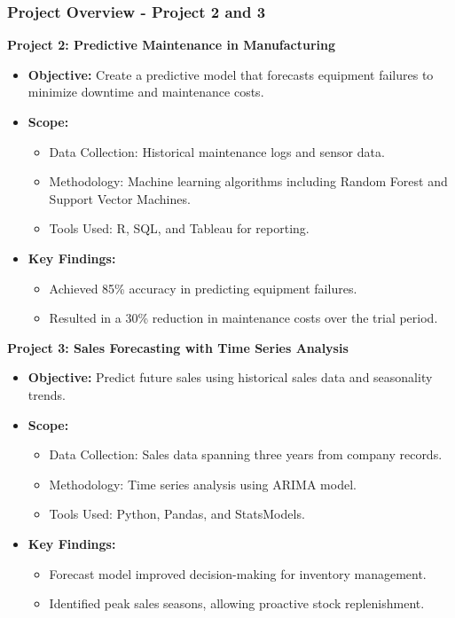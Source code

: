 \documentclass[aspectratio=169]{beamer}
\begin{document}
\begin{frame}[fragile]
    \frametitle{Project Overview - Project 2 and 3}
    \textbf{Project 2: Predictive Maintenance in Manufacturing}
    \begin{itemize}
        \item \textbf{Objective:} Create a predictive model that forecasts equipment failures to minimize downtime and maintenance costs.
        \item \textbf{Scope:}
        \begin{itemize}
            \item Data Collection: Historical maintenance logs and sensor data.
            \item Methodology: Machine learning algorithms including Random Forest and Support Vector Machines.
            \item Tools Used: R, SQL, and Tableau for reporting.
        \end{itemize}
        \item \textbf{Key Findings:}
        \begin{itemize}
            \item Achieved 85\% accuracy in predicting equipment failures.
            \item Resulted in a 30\% reduction in maintenance costs over the trial period.
        \end{itemize}
    \end{itemize}

    \vspace{1em}
    
    \textbf{Project 3: Sales Forecasting with Time Series Analysis}
    \begin{itemize}
        \item \textbf{Objective:} Predict future sales using historical sales data and seasonality trends.
        \item \textbf{Scope:}
        \begin{itemize}
            \item Data Collection: Sales data spanning three years from company records.
            \item Methodology: Time series analysis using ARIMA model.
            \item Tools Used: Python, Pandas, and StatsModels.
        \end{itemize}
        \item \textbf{Key Findings:}
        \begin{itemize}
            \item Forecast model improved decision-making for inventory management.
            \item Identified peak sales seasons, allowing proactive stock replenishment.
        \end{itemize}
    \end{itemize}
\end{frame}
\end{document}
